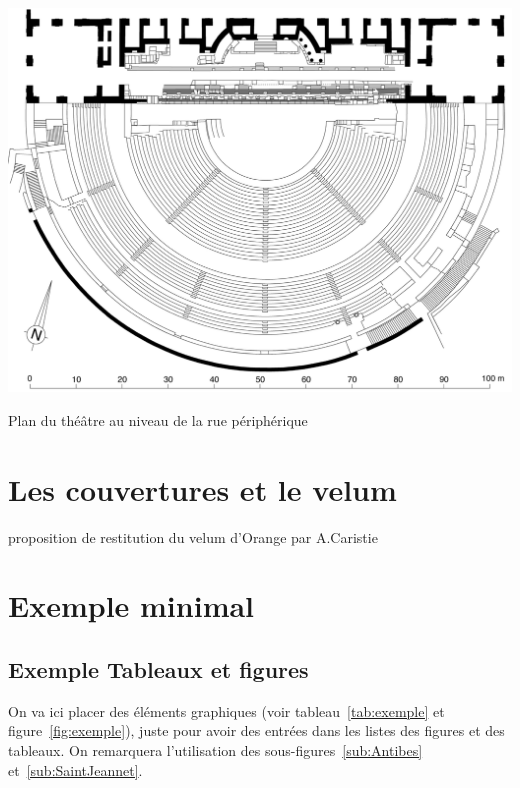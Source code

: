 	\begin{figureth}
		\includegraphics[width=\linewidth]{images/3emeniveau}
		\caption[Vue de dessus - 3ème niveau]{Plan du théâtre au niveau de la rue périphérique \cite[Pl. XIX]{orangePl}}
		\label{2emeniveau}
	\end{figureth}	
		
		
		\section{Les couvertures et le velum}
		
\begin{figureth}
		\caption[Velum]{proposition de restitution du velum d'Orange par A.Caristie}
		
\end{figureth}		

		\section{Exemple minimal}
		
			\subsection{Exemple Tableaux et figures}
			On va ici placer des éléments graphiques (voir tableau~\ref{tab:exemple} et figure~\ref{fig:exemple}), juste pour avoir des entrées dans les listes des figures et des 	tableaux. On remarquera l'utilisation des sous-figures~\ref{sub:Antibes} et~\ref{sub:SaintJeannet}.
	
